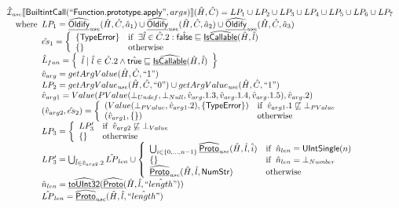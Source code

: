 \[\begin{array}{l}
\hat{\mathcal{I}}_{\it use}\llbracket \mbox{\textsf{BuiltintCall}}(``\mbox{\textsf{Function.prototype.apply}}",args)\rrbracket(\hat{H},\hat{C}) = LP_1 \cup LP_2 \cup LP_3 \cup LP_4 \cup LP_5 \cup LP_6 \cup LP_7\\
\quad{\rm where}\begin{array}[t]{l}
  LP_1 = \widehat{\underline{\sf Oldify}}_{\it use}(\hat{H}, \hat{C}, \hat{a}_1) \cup \widehat{\underline{\sf Oldify}}_{\it use}(\hat{H}, \hat{C}, \hat{a}_2) \cup \widehat{\underline{\sf Oldify}}_{\it use}(\hat{H}, \hat{C}, \hat{a}_3)\\
  \hat{es}_1 = \left\{\begin{array}{ll}
      \{ \mbox{\textsf{TypeError}} \}
      & {\rm if}\begin{array}[t]{l}\exists\hat{l}\in\hat{C}.2: \hat{\mbox{\textsf{false}}} \sqsubseteq \widehat{\underline{\sf IsCallable}}(\hat{H}, \hat{l})\end{array}\\
      \left\{\begin{array}{l}\end{array}\right\} & {\rm otherwise}
    \end{array}\right.\\
  \hat{L}_{fun} = \left\{\begin{array}{l}\hat{l} \mid \hat{l} \in \hat{C}.2 \land \hat{\mbox{\textsf{true}}} \sqsubseteq \widehat{\underline{\sf IsCallable}}(\hat{H}, \hat{l})\end{array}\right\}\\
  \hat{v}_{arg} = getArgValue(\hat{H}, \hat{C}, ``1")\\
  LP_2 = getArgValue_{\it use}(\hat{H}, \hat{C}, ``0") \cup getArgValue_{\it use}(\hat{H}, \hat{C}, ``1")\\
  \hat{v}_{arg1} = Value(PValue(\bot_{Undef}, \bot_{Null}, \hat{v}_{arg}.1.3, \hat{v}_{arg}.1.4, \hat{v}_{arg}.1.5), \hat{v}_{arg}.2)\\
  (\hat{v}_{arg2}, \hat{es}_2) = \left\{\begin{array}{ll}
      (Value(\bot_{PValue}, \hat{v}_{arg1}.2), \{ \mbox{\textsf{TypeError}} \})
      & {\rm if}\begin{array}[t]{l}\hat{v}_{arg1}.1 \not\sqsubseteq \bot_{PValue}\end{array}\\
      (\hat{v}_{arg1}, \left\{\begin{array}{l}\end{array}\right\}) & {\rm otherwise}
    \end{array}\right.\\
  LP_3 =  \left\{\begin{array}{ll}
      LP_3'
      & {\rm if}\begin{array}[t]{l}\hat{v}_{arg2} \not\sqsubseteq \bot_{Value}\end{array}\\
      \left\{\begin{array}{l}\end{array}\right\} & {\rm otherwise}
    \end{array}\right.\\
  LP_3' =  \bigcup_{\hat{l} \in \hat{v}_{arg2}.2} \hat{LP}_{len} \cup \left\{\begin{array}{ll}
      \bigcup_{i \in \{0,...,n-1\}} \widehat{\underline{\sf Proto}}_{\it use}(\hat{H}, \hat{l}, \hat{i})
      & {\rm if}\begin{array}[t]{l}\hat{n}_{len} = \mbox{\textsf{UIntSingle}}(n)\end{array}\\
      \left\{\begin{array}{l}\end{array}\right\} & {\rm if}\begin{array}[t]{l}\hat{n}_{len} = \bot_{Number}\end{array}\\
      \widehat{\underline{\sf Proto}}_{\it use}(\hat{H}, \hat{l}, \mbox{\textsf{NumStr}})& {\rm otherwise}\\
    \end{array}\right.\\
  \hat{n}_{len} = \widehat{\underline{\sf toUInt32}}(\widehat{\underline{\sf Proto}}(\hat{H}, \hat{l}, \hat{``length"}))\\
  \hat{LP}_{len} = \widehat{\underline{\sf Proto}}_{\it use}(\hat{H}, \hat{l}, \hat{``length"})\\
  
\end{array}
\end{array}\]

